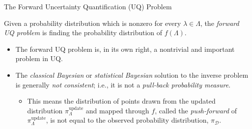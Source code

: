 \documentclass[11pt]{beamer}
\begin{document}
\begin{frame}

\begin{block}{The Forward Uncertainty Quantification (UQ) Problem}

Given a probability distribution which is nonzero for every $\lambda \in \Lambda$, the \emph{forward UQ problem} is finding the probability distribution of $f(\Lambda)$. 


\end{block}


\begin{itemize}

\item The forward UQ problem is, in its own right, a nontrivial and important problem in UQ.

\item The \textit{classical Bayesian} or \textit{statistical Bayesian} solution to the inverse problem is generally {\em not consistent};
i.e., it is not a \textit{pull-back probability measure}. 


\begin{itemize}

	\item This means the distribution of points drawn from the updated distribution $\pi_\Lambda^\text{update}$ and mapped through $f$, called the \textit{push-forward} of $\pi_\Lambda^\text{update}$, is not equal to the observed probability distribution, $\pi_\mathcal{D}$. 

\end{itemize}

\end{itemize}

\end{frame}
\end{document}
